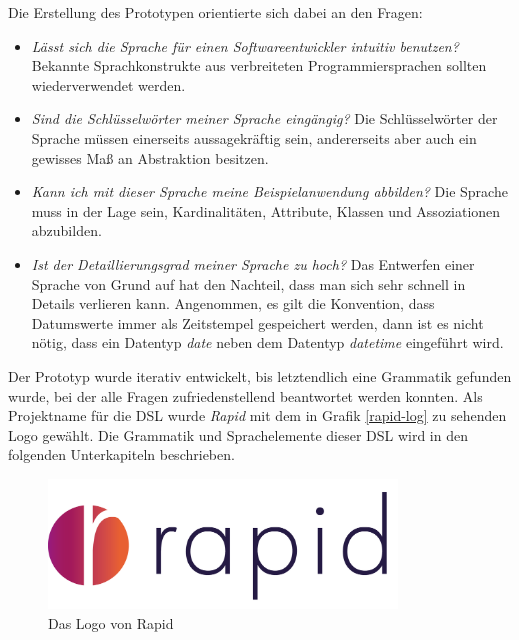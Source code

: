 \documentclass[a4paper,12pt]{scrreprt}
\begin{document}
Die Erstellung des Prototypen orientierte sich dabei an den Fragen:
\begin{itemize}
	\item \textit{Lässt sich die Sprache für einen Softwareentwickler intuitiv benutzen?} Bekannte Sprachkonstrukte aus verbreiteten Programmiersprachen sollten wiederverwendet werden.
	\item \textit{Sind die Schlüsselwörter meiner Sprache eingängig?} Die Schlüsselwörter der Sprache müssen einerseits aussagekräftig sein, andererseits aber auch ein gewisses Maß an Abstraktion besitzen.
	\item \textit{Kann ich mit dieser Sprache meine Beispielanwendung abbilden?} Die Sprache muss in der Lage sein, Kardinalitäten, Attribute, Klassen und Assoziationen abzubilden.
	\item \textit{Ist der Detaillierungsgrad meiner Sprache zu hoch?} Das Entwerfen einer Sprache von Grund auf hat den Nachteil, dass man sich sehr schnell in Details verlieren kann.
	Angenommen, es gilt die Konvention, dass Datums\-werte immer als Zeitstempel gespeichert werden, dann ist es nicht nötig, dass ein Datentyp \textit{date} neben dem Datentyp \textit{datetime} eingeführt wird.
\end{itemize}
Der Prototyp wurde iterativ entwickelt, bis letztendlich eine Grammatik gefunden wurde, bei der alle Fragen zufriedenstellend beantwortet werden konnten. Als Projektname für die DSL wurde \textit{Rapid} mit dem in Grafik \ref{rapid-log} zu sehenden Logo gewählt. Die  Grammatik und Sprachelemente dieser DSL wird in den folgenden Unterkapiteln beschrieben.
\begin{figure}[h]
	\centering
		\includegraphics[width=350px]{img/rapid-logo.png}
		\caption{Das Logo von Rapid}
		\label{fig:rapid-logo}
\end{figure}
\end{document}
